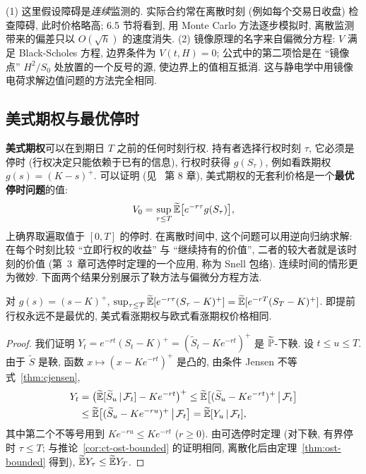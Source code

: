 \begin{remark}
(1) 这里假设障碍是\emph{连续}监测的. 实际合约常在离散时刻 (例如每个交易日收盘) 检查障碍, 此时价格略高; 6.5 节将看到, 用 Monte Carlo 方法逐步模拟时, 离散监测带来的偏差只以 $O(\sqrt{h})$ 的速度消失. (2) 镜像原理的名字来自偏微分方程: $V$ 满足 Black-Scholes 方程, 边界条件为 $V(t,H)=0$; 公式中的第二项恰是在 ``镜像点'' $H^2/S_0$ 处放置的一个反号的源, 使边界上的值相互抵消. 这与静电学中用镜像电荷求解边值问题的方法完全相同.
\end{remark}

\subsection{美式期权与最优停时}

\textbf{美式期权}可以在到期日 $T$ 之前的任何时刻行权. 持有者选择行权时刻 $\tau$, 它必须是停时 (行权决定只能依赖于已有的信息), 行权时获得 $g(S_\tau)$, 例如看跌期权 $g(s)=(K-s)^+$. 可以证明 (见~\cite{shreve} 第 8 章), 美式期权的无套利价格是一个\textbf{最优停时问题}的值:
\begin{equation}\label{eq:american}
V_0=\sup_{\tau\le T}\widetilde{\E}\big[e^{-r\tau}g(S_\tau)\big],
\end{equation}
上确界取遍取值于 $[0,T]$ 的停时. 在离散时间中, 这个问题可以用逆向归纳求解: 在每个时刻比较 ``立即行权的收益'' 与 ``继续持有的价值'', 二者的较大者就是该时刻的价值 (第~3~章可选停时定理的一个应用, 称为 Snell 包络). 连续时间的情形更为微妙. 下面两个结果分别展示了鞅方法与偏微分方程方法.

\begin{proposition}[不付红利的美式看涨期权]\label{prop:american-call}
对 $g(s)=(s-K)^+$, $\sup_{\tau\le T}\widetilde{\E}[e^{-r\tau}(S_\tau-K)^+]=\widetilde{\E}[e^{-rT}(S_T-K)^+]$. 即提前行权永远不是最优的, 美式看涨期权与欧式看涨期权价格相同.
\end{proposition}

\begin{proof}
我们证明 $Y_t=e^{-rt}(S_t-K)^+=(\widetilde{S}_t-Ke^{-rt})^+$ 是 $\widetilde{\P}$-下鞅. 设 $t\le u\le T$. 由于 $\widetilde{S}$ 是鞅, 函数 $x\mapsto(x-Ke^{-rt})^+$ 是凸的, 由条件 Jensen 不等式~\ref{thm:cjensen},
\begin{align*}
Y_t&=\big(\widetilde{\E}[\widetilde{S}_u\,|\,\mathcal{F}_t]-Ke^{-rt}\big)^+\le\widetilde{\E}\big[(\widetilde{S}_u-Ke^{-rt})^+\,\big|\,\mathcal{F}_t\big]\\
&\le\widetilde{\E}\big[(\widetilde{S}_u-Ke^{-ru})^+\,\big|\,\mathcal{F}_t\big]=\widetilde{\E}[Y_u\,|\,\mathcal{F}_t],
\end{align*}
其中第二个不等号用到 $Ke^{-ru}\le Ke^{-rt}$ ($r\ge0$). 由可选停时定理 (对下鞅, 有界停时 $\tau\le T$; 与推论~\ref{cor:ct-ost-bounded} 的证明相同, 离散化后由定理~\ref{thm:ost-bounded} 得到), $\widetilde{\E}Y_\tau\le\widetilde{\E}Y_T$.
\end{proof}

